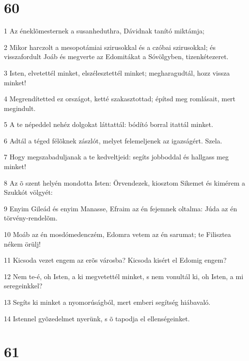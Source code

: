 \chapter{60}

\par 1 Az éneklõmesternek a susanheduthra, Dávidnak tanító miktámja;
\par 2 Mikor harczolt a mesopotámiai szirusokkal és a czóbai szirusokkal; és visszafordult Joáb és megverte az Edomitákat a Sóvölgyben, tizenkétezeret.
\par 3 Isten, elvetettél minket, elszélesztettél minket; megharagudtál, hozz vissza minket!
\par 4 Megrendítetted ez országot, ketté szakasztottad; építsd meg romlásait, mert megindult.
\par 5 A te népeddel nehéz dolgokat láttattál: bódító borral itattál minket.
\par 6 Adtál a téged félõknek zászlót, melyet felemeljenek az igazságért. Szela.
\par 7 Hogy megszabaduljanak a te kedveltjeid: segíts jobboddal és hallgass meg minket!
\par 8 Az õ szent helyén mondotta Isten: Örvendezek, kiosztom Sikemet és kimérem a Szukkót völgyét:
\par 9 Enyim Gileád és enyim Manasse, Efraim az én fejemnek oltalma: Júda az én törvény-rendelõm.
\par 10 Moáb az én mosdómedenczém, Edomra vetem az én sarumat; te Filisztea nékem örülj!
\par 11 Kicsoda vezet engem az erõs városba? Kicsoda kisért el Edomig engem?
\par 12 Nem te-é, oh Isten, a ki megvetettél minket, s nem vonultál ki, oh Isten, a mi seregeinkkel?
\par 13 Segíts ki minket a nyomorúságból, mert emberi segítség hiábavaló.
\par 14 Istennel gyõzedelmet nyerünk, s õ tapodja el ellenségeinket.

\chapter{61}

